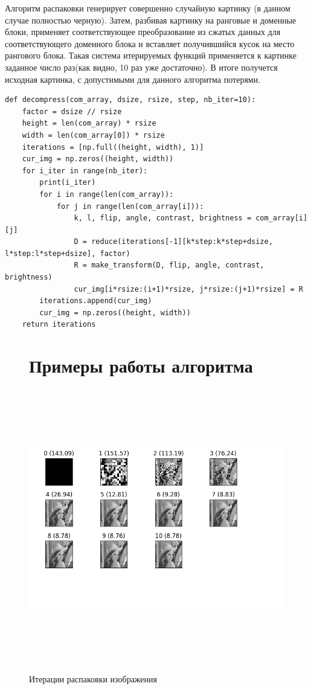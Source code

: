\documentclass[12pt, fleqn]{article}
\begin{document}
Алгоритм распаковки генерирует совершенно случайную картинку (в данном случае полностью черную). Затем, разбивая картинку на ранговые и доменные блоки, применяет соответствующее преобразование из сжатых данных для соответствующего доменного блока и вставляет получившийся кусок на место рангового блока. Такая система итерируемых функций применяется к картинке заданное число раз(как видно, 10 раз уже достаточно). В итоге получется исходная картинка, с допустимыми для данного алгоритма потерями.
\newpage
\begin{lstlisting}[label=Код,caption= Распаковка изображения]
def decompress(com_array, dsize, rsize, step, nb_iter=10):
    factor = dsize // rsize
    height = len(com_array) * rsize
    width = len(com_array[0]) * rsize
    iterations = [np.full((height, width), 1)]
    cur_img = np.zeros((height, width))
    for i_iter in range(nb_iter):
        print(i_iter)
        for i in range(len(com_array)):
            for j in range(len(com_array[i])):
                k, l, flip, angle, contrast, brightness = com_array[i][j]
                D = reduce(iterations[-1][k*step:k*step+dsize, l*step:l*step+dsize], factor)
                R = make_transform(D, flip, angle, contrast, brightness)
                cur_img[i*rsize:(i+1)*rsize, j*rsize:(j+1)*rsize] = R
        iterations.append(cur_img)
        cur_img = np.zeros((height, width))
    return iterations
\end{lstlisting}

\begin{figure}[H]
\section{Примеры работы алгоритма}
\begin{center}
\includegraphics[width=460pt,height=350pt]{example.png}
\caption{Итерации распаковки изображения}
\end{center}
\end{figure}
\end{document}
